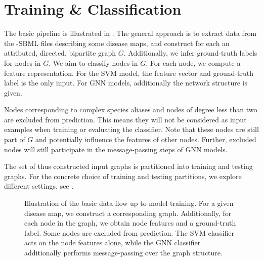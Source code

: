 \documentclass[
	fontsize=10pt, %
	twoside=false, %
	secnumdepth=1, %
  toc=indentunnumbered %
]{kaobook}
\begin{document}




\section{Training \& Classification}
\label{sec:classification}


The basic pipeline is illustrated in . The general
approach is to extract data from the -SBML files
describing some disease maps, and construct for each an attributed, directed,
bipartite graph $G$. Additionally, we infer ground-truth labels for nodes in
$G$. We aim to classify nodes in $G$. For each node, we compute a feature
representation. For the SVM model, the feature vector and ground-truth label is
the only input. For GNN models, additionally the network structure is given.

Nodes corresponding to complex species aliases and nodes of degree less than two
are excluded from prediction. This means they will not be considered as input
examples when training or evaluating the classifier. Note that these nodes are
still part of $G$ and potentially influence the features of other nodes.
Further, excluded nodes will still participate in the message-passing steps of
GNN models.

The set of thus constructed input graphs is partitioned into training and
testing graphs. For the concrete choice of training and testing partitions, we
explore different settings, see .

\begin{figure}[h]
  \centering
  \caption{Illustration of the basic data flow up to model training. For a given
  disease map, we construct a corresponding graph. Additionally, for each node
  in the graph, we obtain node features and a ground-truth label. Some nodes are
excluded from prediction. The SVM classifier acts on the node features alone,
while the GNN classifier additionally performs message-passing over the graph structure.}
  \label{fig:diag-pipeline}
\end{figure}
\end{document}
